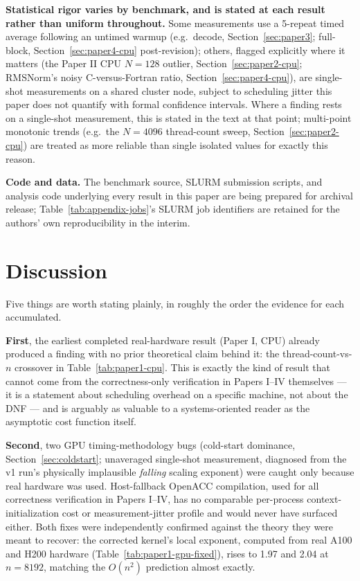 \documentclass[11pt]{article}
\begin{document}
\textbf{Statistical rigor varies by benchmark, and is stated at each
result rather than uniform throughout.} Some measurements use a
5-repeat timed average following an untimed warmup (e.g.\ decode,
Section~\ref{sec:paper3}; full-block, Section~\ref{sec:paper4-cpu}
post-revision); others, flagged explicitly where it matters (the
Paper II CPU $N{=}128$ outlier, Section~\ref{sec:paper2-cpu}; RMSNorm's
noisy C-versus-Fortran ratio, Section~\ref{sec:paper4-cpu}), are
single-shot measurements on a shared cluster node, subject to
scheduling jitter this paper does not quantify with formal confidence
intervals. Where a finding rests on a single-shot measurement, this is
stated in the text at that point; multi-point monotonic trends (e.g.\
the $N{=}4096$ thread-count sweep, Section~\ref{sec:paper2-cpu}) are
treated as more reliable than single isolated values for exactly this
reason.

\textbf{Code and data.} The benchmark source, SLURM submission
scripts, and analysis code underlying every result in this paper are
being prepared for archival release; Table~\ref{tab:appendix-jobs}'s
SLURM job identifiers are retained for the authors' own reproducibility
in the interim.

\section{Discussion}

Five things are worth stating plainly, in roughly the order the
evidence for each accumulated.

\textbf{First}, the earliest completed real-hardware result (Paper I,
CPU) already produced a finding with no prior theoretical claim behind
it: the thread-count-vs-$n$ crossover in Table~\ref{tab:paper1-cpu}.
This is exactly the kind of result that cannot come from the
correctness-only verification in Papers I--IV themselves --- it is a
statement about scheduling overhead on a specific machine, not about
the DNF --- and is arguably as valuable to a systems-oriented reader as
the asymptotic cost function itself.

\textbf{Second}, two GPU timing-methodology bugs (cold-start dominance,
Section~\ref{sec:coldstart}; unaveraged single-shot measurement,
diagnosed from the v1 run's physically implausible \emph{falling}
scaling exponent) were caught only because real hardware was used.
Host-fallback OpenACC compilation, used for all correctness
verification in Papers I--IV, has no comparable per-process
context-initialization cost or measurement-jitter profile and would
never have surfaced either. Both fixes were independently confirmed
against the theory they were meant to recover: the corrected kernel's
local exponent, computed from real A100 and H200 hardware
(Table~\ref{tab:paper1-gpu-fixed}), rises to 1.97 and 2.04 at
$n=8192$, matching the $O(n^2)$ prediction almost exactly.
\end{document}
